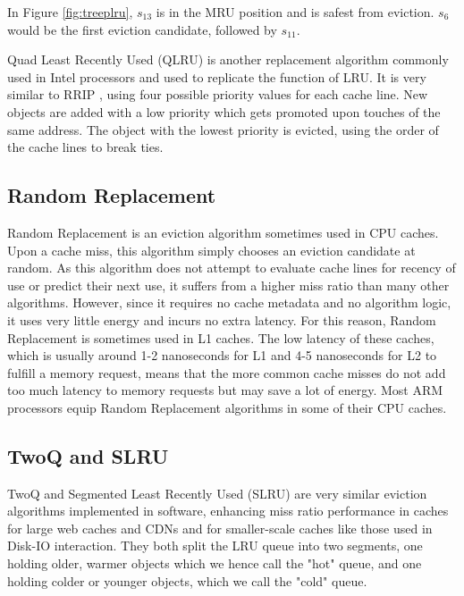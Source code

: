 \documentclass[letterpaper]{article}
\begin{document}
In Figure \ref{fig:treeplru}, 
$s_{13}$ is in the MRU position and is safest from eviction.
$s_6$ would be the first eviction candidate,
followed by $s_{11}$.

Quad Least Recently Used (QLRU) is another replacement algorithm
commonly used in Intel processors and used to replicate the function of LRU.
It is very similar to RRIP \cite{RRIP}, using four possible priority values for each cache line.
New objects are added with a low priority which gets promoted upon touches of the same address.
The object with the lowest priority is evicted, using the order of the cache lines to break ties.

\subsection{Random Replacement}

Random Replacement is an eviction algorithm sometimes used in CPU caches.
Upon a cache miss, this algorithm simply chooses an eviction candidate at random.
As this algorithm does not attempt to evaluate cache lines for recency of use
or predict their next use, it suffers from a higher miss ratio than many other algorithms.
However, since it requires no cache metadata and no algorithm logic,
it uses very little energy and incurs no extra latency.
For this reason, Random Replacement is sometimes used in L1 caches.
The low latency of these caches, which is usually around 1-2 nanoseconds for L1
and 4-5 nanoseconds for L2 to fulfill a memory request,
means that the more common cache misses do not add too much latency to memory requests
but may save a lot of energy.
Most ARM processors equip Random Replacement algorithms in some of their CPU caches.

\subsection{TwoQ and SLRU}

TwoQ \cite{TwoQ} and Segmented Least Recently Used (SLRU) \cite{SLRU}
are very similar eviction algorithms implemented in software,
enhancing miss ratio performance in caches for large web caches and CDNs
and for smaller-scale caches like those used in Disk-IO interaction.
They both split the LRU queue into two segments, one holding older, warmer objects
which we hence call the "hot" queue,
and one holding colder or younger objects,
which we call the "cold" queue.
\end{document}
